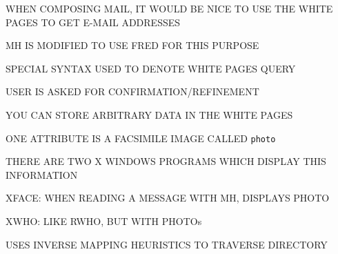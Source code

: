 \begin{bwslide}

\begin{nrtc}
\item	WHEN COMPOSING MAIL, IT WOULD BE NICE TO USE THE WHITE PAGES TO GET
	E-MAIL ADDRESSES

\item	MH IS MODIFIED TO USE FRED FOR THIS PURPOSE
    \begin{nrtc}
    \item	SPECIAL SYNTAX USED TO DENOTE WHITE PAGES QUERY

    \item	USER IS ASKED FOR CONFIRMATION/REFINEMENT
    \end{nrtc}
\end{nrtc}
\end{bwslide}


\begin{bwslide}

\begin{nrtc}
\item	YOU CAN STORE ARBITRARY DATA IN THE WHITE PAGES

\item	ONE ATTRIBUTE IS A FACSIMILE IMAGE CALLED \verb"photo"

\item	THERE ARE TWO X WINDOWS PROGRAMS WHICH DISPLAY THIS INFORMATION
    \begin{nrtc}
    \item	XFACE: WHEN READING A MESSAGE WITH MH, DISPLAYS PHOTO

    \item	XWHO: LIKE RWHO, BUT WITH PHOTOs
    \end{nrtc}

\item	USES INVERSE MAPPING HEURISTICS TO TRAVERSE DIRECTORY
\end{nrtc}
\end{bwslide}


